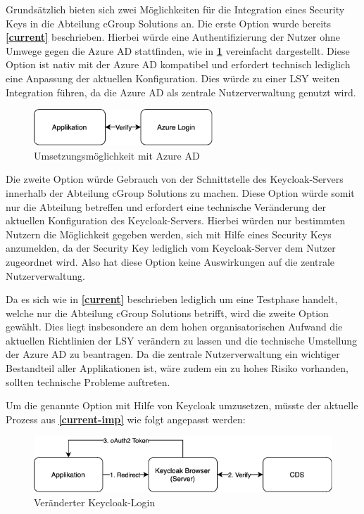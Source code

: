 Grundsätzlich bieten sich zwei Möglichkeiten für die Integration eines Security Keys in die Abteilung cGroup Solutions an. Die erste Option wurde bereits \textbf{\ref{current}} beschrieben. Hierbei würde eine Authentifizierung der Nutzer ohne Umwege gegen die Azure \ac{AD} stattfinden, wie in \textbf{\ref{azure-imp}} vereinfacht dargestellt. Diese Option ist nativ mit der Azure \ac{AD} kompatibel und erfordert technisch lediglich eine Anpassung der aktuellen Konfiguration. Dies würde zu einer \ac{LSY} weiten Integration führen, da die Azure \ac{AD} als zentrale Nutzerverwaltung genutzt wird.

\begin{figure}[h]
	\centering 
	\includegraphics[width=0.6\textwidth]{img/abbildungen/azure_umsetzung.png}
	\captionsetup{format=hang}
	\caption{Umsetzungsmöglichkeit mit Azure \ac{AD}} \label{azure-imp}
\end{figure}

Die zweite Option würde Gebrauch von der Schnittstelle des Keycloak-Servers innerhalb der Abteilung cGroup Solutions zu machen. Diese Option würde somit nur die Abteilung betreffen und erfordert eine technische Veränderung der aktuellen Konfiguration des Keycloak-Servers. Hierbei würden nur bestimmten Nutzern die Möglichkeit gegeben werden, sich mit Hilfe eines Security Keys anzumelden, da der Security Key lediglich vom Keycloak-Server dem Nutzer zugeordnet wird. Also hat diese Option keine Auswirkungen auf die zentrale Nutzerverwaltung. 

Da es sich wie in \textbf{\ref{current}} beschrieben lediglich um eine Testphase handelt, welche nur die Abteilung cGroup Solutions betrifft, wird die zweite Option gewählt. Dies liegt insbesondere an dem hohen organisatorischen Aufwand die aktuellen Richtlinien der \ac{LSY} verändern zu lassen und die technische Umstellung der Azure \ac{AD} zu beantragen. Da die zentrale Nutzerverwaltung ein wichtiger Bestandteil aller Applikationen ist, wäre zudem ein zu hohes Risiko vorhanden, sollten technische Probleme auftreten. 

Um die genannte Option mit Hilfe von Keycloak umzusetzen, müsste der aktuelle Prozess aus \textbf{\ref{current-imp}} wie folgt angepasst werden:

\begin{figure}[H]
	\centering 
	\includegraphics[width=1\textwidth]{img/abbildungen/keycloak_browser.png}
	\captionsetup{format=hang}
	\caption{Veränderter Keycloak-Login}
\end{figure}

